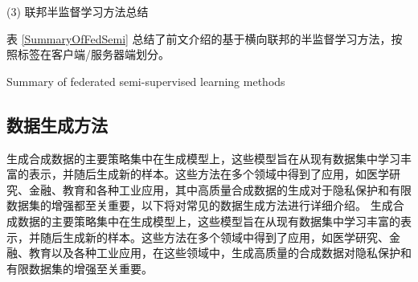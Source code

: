 (3) 联邦半监督学习方法总结

表 \ref{SummaryOfFedSemi} 总结了前文介绍的基于横向联邦的半监督学习方法，按照标签在客户端/服务器端划分。

\begin{table}[h]
	
	\centering  %
	{\songti \wuhao Summary of federated semi-supervised learning methods}
	\label{SummaryOfFedSemi}
	
\end{table}


\subsection{数据生成方法}
生成合成数据的主要策略集中在生成模型上，这些模型旨在从现有数据集中学习丰富的表示，并随后生成新的样本。这些方法在多个领域中得到了应用，如医学研究、金融、教育和各种工业应用，其中高质量合成数据的生成对于隐私保护和有限数据集的增强都至关重要，以下将对常见的数据生成方法进行详细介绍。  
生成合成数据的主要策略集中在生成模型上，这些模型旨在从现有数据集中学习丰富的表示，并随后生成新的样本。这些方法在多个领域中得到了应用，如医学研究、金融、教育以及各种工业应用，在这些领域中，生成高质量的合成数据对隐私保护和有限数据集的增强至关重要。

